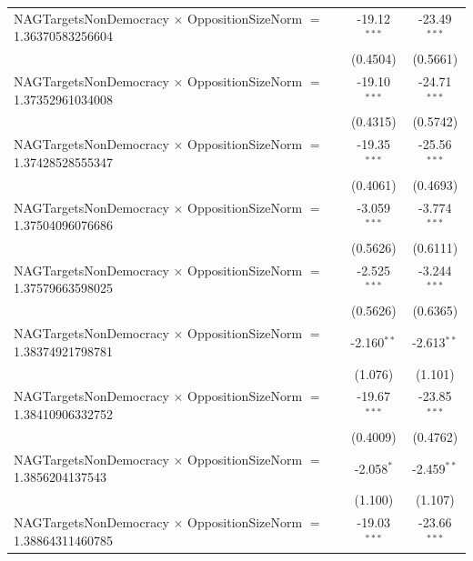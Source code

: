 \begin{tabular}{lcc}
   NAGTargetsNonDemocracy $\times$ OppositionSizeNorm $=$ 1.36370583256604      & -19.12$^{***}$       & -23.49$^{***}$\\   
                                                                                & (0.4504)             & (0.5661)\\   
   NAGTargetsNonDemocracy $\times$ OppositionSizeNorm $=$ 1.37352961034008      & -19.10$^{***}$       & -24.71$^{***}$\\   
                                                                                & (0.4315)             & (0.5742)\\   
   NAGTargetsNonDemocracy $\times$ OppositionSizeNorm $=$ 1.37428528555347      & -19.35$^{***}$       & -25.56$^{***}$\\   
                                                                                & (0.4061)             & (0.4693)\\   
   NAGTargetsNonDemocracy $\times$ OppositionSizeNorm $=$ 1.37504096076686      & -3.059$^{***}$       & -3.774$^{***}$\\   
                                                                                & (0.5626)             & (0.6111)\\   
   NAGTargetsNonDemocracy $\times$ OppositionSizeNorm $=$ 1.37579663598025      & -2.525$^{***}$       & -3.244$^{***}$\\   
                                                                                & (0.5626)             & (0.6365)\\   
   NAGTargetsNonDemocracy $\times$ OppositionSizeNorm $=$ 1.38374921798781      & -2.160$^{**}$        & -2.613$^{**}$\\   
                                                                                & (1.076)              & (1.101)\\   
   NAGTargetsNonDemocracy $\times$ OppositionSizeNorm $=$ 1.38410906332752      & -19.67$^{***}$       & -23.85$^{***}$\\   
                                                                                & (0.4009)             & (0.4762)\\   
   NAGTargetsNonDemocracy $\times$ OppositionSizeNorm $=$ 1.3856204137543       & -2.058$^{*}$         & -2.459$^{**}$\\   
                                                                                & (1.100)              & (1.107)\\   
   NAGTargetsNonDemocracy $\times$ OppositionSizeNorm $=$ 1.38864311460785      & -19.03$^{***}$       & -23.66$^{***}$\\   

\end{tabular}
